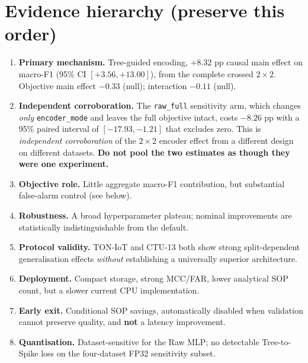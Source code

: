 %

\section*{Evidence hierarchy (preserve this order)}

\begin{enumerate}
  \item \textbf{Primary mechanism.} Tree-guided encoding, $+8.32$ pp causal main
        effect on macro-F1 (95\% CI $[+3.56, +13.00]$), from the complete crossed
        $2\times2$. Objective main effect $-0.33$ (null); interaction $-0.11$ (null).
  \item \textbf{Independent corroboration.} The \texttt{raw\_full} sensitivity arm,
        which changes \emph{only} \texttt{encoder\_mode} and leaves the full objective
        intact, costs $-8.26$ pp with a 95\% paired interval of $[-17.93, -1.21]$ that
        excludes zero. This is \emph{independent corroboration} of the $2\times2$
        encoder effect from a different design on different datasets. \textbf{Do not
        pool the two estimates as though they were one experiment.}
  \item \textbf{Objective role.} Little aggregate macro-F1 contribution, but
        substantial false-alarm control (see below).
  \item \textbf{Robustness.} A broad hyperparameter plateau; nominal improvements are
        statistically indistinguishable from the default.
  \item \textbf{Protocol validity.} TON-IoT and CTU-13 both show strong
        split-dependent generalisation effects \emph{without} establishing a
        universally superior architecture.
  \item \textbf{Deployment.} Compact storage, strong MCC/FAR, lower analytical SOP
        count, but a slower current CPU implementation.
  \item \textbf{Early exit.} Conditional SOP savings, automatically disabled when
        validation cannot preserve quality, and \textbf{not} a latency improvement.
  \item \textbf{Quantisation.} Dataset-sensitive for the Raw MLP; no detectable
        Tree-to-Spike loss on the four-dataset FP32 sensitivity subset.
\end{enumerate}

